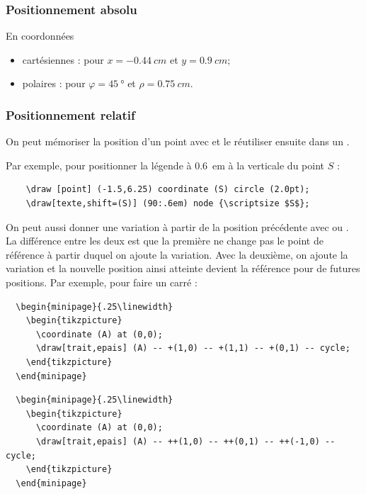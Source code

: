 \documentclass[10pt,a4paper]{report}
\begin{document}
\subsubsection{Positionnement absolu}

En coordonnées
\begin{itemize}
	\item cartésiennes :  pour $x=\SI{-0.44}{cm}$ et $y=\SI{0.9}{cm}$;
	\item polaires :  pour $\varphi = \SI{45}{\degree}$ et $\rho = \SI{0.75}{cm}$.
\end{itemize}


\subsubsection{Positionnement relatif}

On peut mémoriser la position d'un point avec  et le réutiliser ensuite dans un .

Par exemple, pour positionner la légende à \SI{0.6}{em} à la verticale du point $S$ :

\begin{verbatim}
	\draw [point] (-1.5,6.25) coordinate (S) circle (2.0pt);
	\draw[texte,shift=(S)] (90:.6em) node {\scriptsize $S$};
\end{verbatim}

On peut aussi donner une variation à partir de la position précédente avec \inlatex{+(0cm,1cm)} ou \inlatex{++(2cm,0cm)}. La différence entre les deux est que la première ne change pas le point de référence à partir duquel on ajoute la variation. Avec la deuxième, on ajoute la variation et la nouvelle position ainsi atteinte devient la référence pour de futures positions. Par exemple, pour faire un carré :

\begin{verbatim}
  \begin{minipage}{.25\linewidth}
    \begin{tikzpicture}
      \coordinate (A) at (0,0);
      \draw[trait,epais] (A) -- +(1,0) -- +(1,1) -- +(0,1) -- cycle;
    \end{tikzpicture}
  \end{minipage}
\end{verbatim}

\begin{verbatim}
  \begin{minipage}{.25\linewidth}
    \begin{tikzpicture}
      \coordinate (A) at (0,0);
      \draw[trait,epais] (A) -- ++(1,0) -- ++(0,1) -- ++(-1,0) -- cycle;
    \end{tikzpicture}
  \end{minipage}
\end{verbatim}
\end{document}
